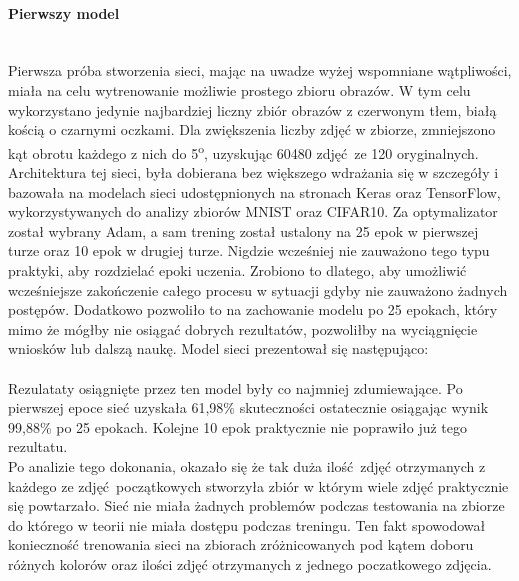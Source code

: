 \paragraph{Pierwszy model} \mbox{}\\
Pierwsza próba stworzenia sieci, mając na uwadze wyżej wspomniane wątpliwości, miała
na celu wytrenowanie możliwie prostego zbioru obrazów. W tym celu wykorzystano jedynie
najbardziej liczny zbiór obrazów z czerwonym tłem, białą kością o czarnymi oczkami. Dla
zwiększenia liczby zdjęć w zbiorze, zmniejszono kąt obrotu każdego z nich do
5\textsuperscript{o}, uzyskując 60480 zdjęć ze 120 oryginalnych.\\
Architektura tej sieci, była dobierana bez większego wdrażania się w szczegóły i
bazowała na modelach sieci udostępnionych na stronach Keras oraz TensorFlow,
wykorzystywanych do analizy zbiorów MNIST oraz CIFAR10. Za optymalizator został wybrany
Adam, a sam trening został ustalony na 25 epok w pierwszej turze oraz 10 epok w drugiej
turze. Nigdzie wcześniej nie zauważono tego typu praktyki, aby rozdzielać epoki uczenia.
Zrobiono to dlatego, aby umożliwić wcześniejsze zakończenie całego procesu w sytuacji
gdyby nie zauważono żadnych postępów. Dodatkowo pozwoliło to na zachowanie modelu
po 25 epokach, który mimo że mógłby nie osiągać dobrych rezultatów, pozwoliłby
na wyciągnięcie wniosków lub dalszą naukę. Model sieci prezentował się następująco:\\\\
Rezulataty osiągnięte przez ten model były co najmniej zdumiewające. Po pierwszej epoce
sieć uzyskała 61,98\% skuteczności ostatecznie osiągając wynik 99,88\% po 25 epokach.
Kolejne 10 epok praktycznie nie poprawiło już tego rezultatu.\\
Po analizie tego dokonania, okazało się że tak duża ilość zdjęć otrzymanych
z każdego ze zdjęć początkowych stworzyła zbiór w którym wiele zdjęć praktycznie się
powtarzało. Sieć nie miała żadnych problemów podczas testowania na zbiorze
do którego w teorii nie miała dostępu podczas treningu. Ten fakt spowodował konieczność
trenowania sieci na zbiorach zróżnicowanych pod kątem doboru różnych kolorów oraz
ilości zdjęć otrzymanych z jednego poczatkowego zdjęcia.

